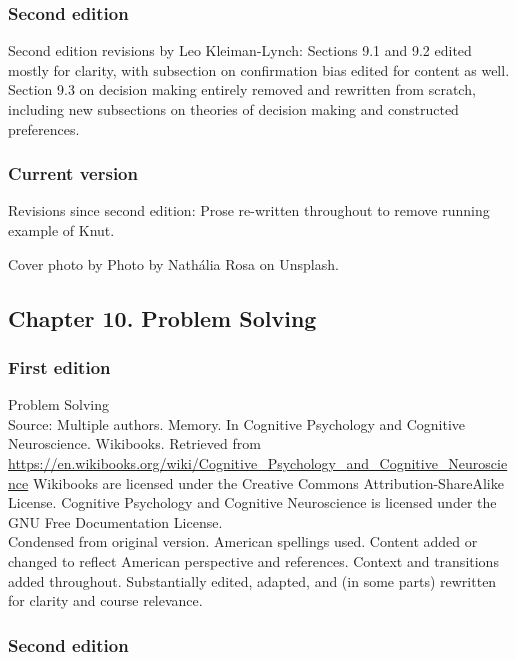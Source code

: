 \documentclass[
]{krantz}
\begin{document}
\subsubsection*{Second edition}\label{second-edition-8}


Second edition revisions by Leo Kleiman-Lynch: Sections 9.1 and 9.2 edited mostly for clarity, with subsection on confirmation bias edited for content as well. Section 9.3 on decision making entirely removed and rewritten from scratch, including new subsections on theories of decision making and constructed preferences.

\subsubsection*{Current version}\label{current-version-4}


Revisions since second edition: Prose re-written throughout to remove running example of Knut.

Cover photo by Photo by Nathália Rosa on Unsplash.

\subsection*{Chapter 10. Problem Solving}\label{chapter-10.-problem-solving}


\subsubsection*{First edition}\label{first-edition-10}


Problem Solving\\
Source: Multiple authors. Memory. In Cognitive Psychology and Cognitive Neuroscience. Wikibooks. Retrieved from \url{https://en.wikibooks.org/wiki/Cognitive_Psychology_and_Cognitive_Neuroscience}
Wikibooks are licensed under the Creative Commons Attribution-ShareAlike License.
Cognitive Psychology and Cognitive Neuroscience is licensed under the GNU Free Documentation License.\\
Condensed from original version. American spellings used. Content added or changed to reflect American perspective and references. Context and transitions added throughout. Substantially edited, adapted, and (in some parts) rewritten for clarity and course relevance.

\subsubsection*{Second edition}\label{second-edition-9}
\end{document}
